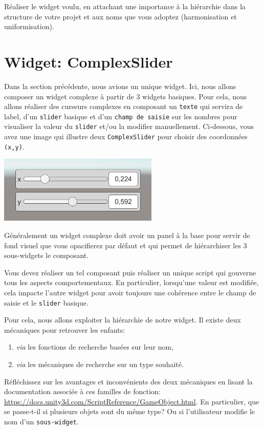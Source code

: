 \documentclass[a4paper,10pt]{article}
\newenvironment{info}%
{\begin{tcolorbox}[breakable,colback=green!5!white,colframe=green!75!black,title=Information]}%
{\end{tcolorbox}}
\begin{document}
Réaliser le widget voulu, en attachant une importance à la hiérarchie dans la structure de votre projet et aux noms que vous adoptez (harmonisation et uniformisation).

\section{Widget: ComplexSlider}

Dans la section précédente, nous avions un unique widget. Ici, nous allons composer un widget complexe à partir de 3 widgets basiques. Pour cela, nous allons réaliser des curseurs complexes en composant un \texttt{texte} qui servira de label, d'un \texttt{slider} basique et d'un \texttt{champ de saisie} sur les nombres pour visualiser la valeur du \texttt{slider} et/ou la modifier manuellement. Ci-dessous, vous avez une image qui illustre deux \texttt{ComplexSlider} pour choisir des coordonnées \texttt{(x,y)}.

\begin{center}
	\includegraphics[width=0.5\linewidth]{rc/widget_complexslider_demo}
\end{center}

\begin{info}
Généralement un widget complexe doit avoir un panel à la base pour servir de fond visuel que vous opacifierez par défaut et qui permet de hiérarchiser les 3 sous-widgets le composant.
\end{info}

Vous devez réaliser un tel composant puis réaliser un unique script qui gouverne tous les aspects comportementaux. En particulier, lorsqu'une valeur est modifiée, cela impacte l'autre widget pour avoir toujours une cohérence entre le champ de saisie et le \texttt{slider} basique.

Pour cela, nous allons exploiter la hiérarchie de notre widget. Il existe deux mécaniques pour retrouver les enfants:
\begin{enumerate}
	\item \textit{via} les fonctions de recherche basées sur leur nom,
	\item \textit{via} les mécaniques de recherche sur un type souhaité.
\end{enumerate}
Réfléchissez sur les avantages et inconvénients des deux mécaniques en lisant la documentation associée à ces familles de fonction: \url{https://docs.unity3d.com/ScriptReference/GameObject.html}.
En particulier, que se passe-t-il si plusieurs objets sont du même type? Ou si l'utilisateur modifie le nom d'un \texttt{sous-widget}.
\end{document}
